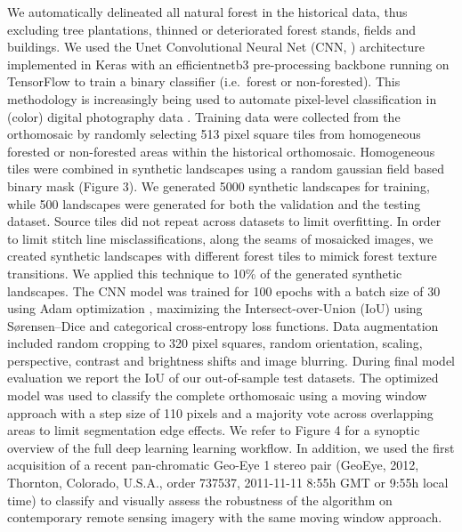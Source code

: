 \documentclass[remote sensing,article,submit,moreauthors,pdftex,10pt,a4paper]{mdpi}
\begin{document}
We automatically delineated all natural forest in the historical data,
thus excluding tree plantations, thinned or deteriorated forest stands,
fields and buildings. We used the Unet Convolutional Neural Net (CNN,
\citet{ronneberger2015}) architecture implemented in Keras
\citep{chollet2015} with an efficientnetb3 pre-processing backbone
\citep{yakubovskiy2019} running on TensorFlow \citep{martinabadi2015} to
train a binary classifier (i.e.~forest or non-forested). This
methodology is increasingly being used to automate pixel-level
classification in (color) digital photography data \citep{buscombe2018}.
Training data were collected from the orthomosaic by randomly selecting
513 pixel square tiles from homogeneous forested or non-forested areas
within the historical orthomosaic. Homogeneous tiles were combined in
synthetic landscapes using a random gaussian field based binary mask
(Figure 3). We generated 5000 synthetic landscapes for training, while
500 landscapes were generated for both the validation and the testing
dataset. Source tiles did not repeat across datasets to limit
overfitting. In order to limit stitch line misclassifications, along the
seams of mosaicked images, we created synthetic landscapes with
different forest tiles to mimick forest texture transitions. We applied
this technique to 10\% of the generated synthetic landscapes. The CNN
model was trained for 100 epochs with a batch size of 30 using Adam
optimization \citep{kingma2017}, maximizing the Intersect-over-Union
(IoU) using Sørensen--Dice and categorical cross-entropy loss functions.
Data augmentation included random cropping to 320 pixel squares, random
orientation, scaling, perspective, contrast and brightness shifts and
image blurring. During final model evaluation we report the IoU of our
out-of-sample test datasets. The optimized model was used to classify
the complete orthomosaic using a moving window approach with a step size
of 110 pixels and a majority vote across overlapping areas to limit
segmentation edge effects. We refer to Figure 4 for a synoptic overview
of the full deep learning learning workflow. In addition, we used the
first acquisition of a recent pan-chromatic Geo-Eye 1 stereo pair
(GeoEye, 2012, Thornton, Colorado, U.S.A., order 737537, 2011-11-11
8:55h GMT or 9:55h local time) to classify and visually assess the
robustness of the algorithm on contemporary remote sensing imagery with
the same moving window approach.
\end{document}
